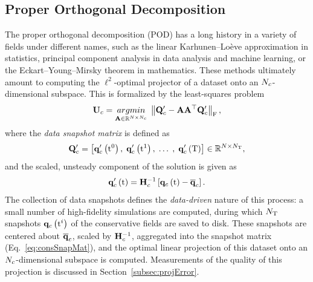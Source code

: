 \subsection{Proper Orthogonal Decomposition}\label{subsec:POD}
%
The proper orthogonal decomposition (POD) has a long history in a variety of fields under different names, such as the linear Karhunen--Loève approximation in statistics, principal component analysis in data analysis and machine learning, or the Eckart--Young--Mirsky theorem in mathematics. These methods ultimately amount to computing the $\ell^2$-optimal projector of a dataset onto an $N_c$-dimensional subspace. This is formalized by the least-squares problem
%
\begin{equation}\label{eq:podLS}
    \consTrial = \argmin{\dummyMatOne \inRTwo{\numDOF}{\numConsModes}} \norm{ \consDataMatUns - \dummyMatOne \dummyMatOne^\top \consDataMatUns }_\text{F},
\end{equation}
%
where the \textit{data snapshot matrix} is defined as
%
\begin{equation}\label{eq:consSnapMat}
	\consDataMatUns = \left[ \consFuncUns{\initTime}, \; \consFuncUns{\timeVar^1}, \; \hdots \; , \; \consFuncUns{\finalTime} \right] \in \RTwo{\numDOF}{\numSnaps},
\end{equation}
%
and the scaled, unsteady component of the solution is given as
%
\begin{equation}\label{eq:consUns}
	\consFuncUns{\timeVar} = \consScaleInv \left[\consFunc{\timeVar} - \consVecCent\right].
\end{equation}
%
The collection of data snapshots defines the \textit{data-driven} nature of this process: a small number of high-fidelity simulations are computed, during which $N_{\text{T}}$ snapshots $\mathbf{q}_{c} \left(\text{t}^{i}\right)$ of the conservative fields are saved to disk. These snapshots are centered about $\mathbf{\overline{q}}_{c}$, scaled by $\consScaleInv$, aggregated into the snapshot matrix (Eq.~\ref{eq:consSnapMat}), and the optimal linear projection of this dataset onto an $N_c$-dimensional subspace is computed. Measurements of the quality of this projection is discussed in Section~\ref{subsec:projError}.

